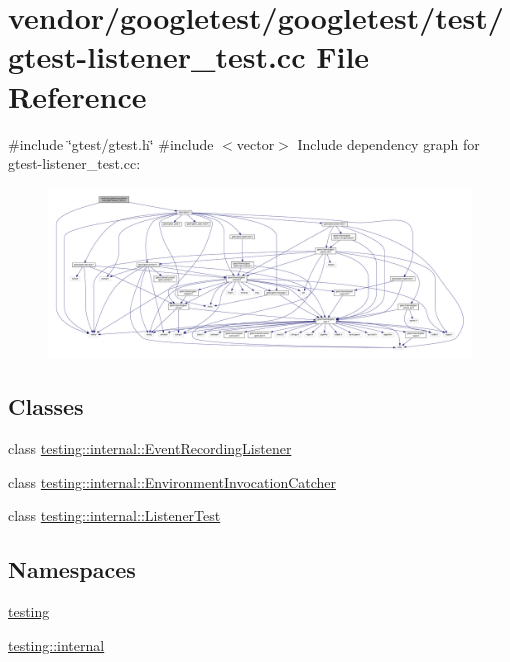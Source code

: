 \hypertarget{gtest-listener__test_8cc}{}\section{vendor/googletest/googletest/test/gtest-\/listener\+\_\+test.cc File Reference}
\label{gtest-listener__test_8cc}
{\ttfamily \#include \char`\"{}gtest/gtest.\+h\char`\"{}}\newline
{\ttfamily \#include $<$vector$>$}\newline
Include dependency graph for gtest-\/listener\+\_\+test.cc\+:
\nopagebreak
\begin{figure}[H]
\begin{center}
\leavevmode
\includegraphics[width=350pt]{gtest-listener__test_8cc__incl}
\end{center}
\end{figure}
\subsection*{Classes}
\begin{DoxyCompactItemize}
\item 
class \hyperlink{classtesting_1_1internal_1_1_event_recording_listener}{testing\+::internal\+::\+Event\+Recording\+Listener}
\item 
class \hyperlink{classtesting_1_1internal_1_1_environment_invocation_catcher}{testing\+::internal\+::\+Environment\+Invocation\+Catcher}
\item 
class \hyperlink{classtesting_1_1internal_1_1_listener_test}{testing\+::internal\+::\+Listener\+Test}
\end{DoxyCompactItemize}
\subsection*{Namespaces}
\begin{DoxyCompactItemize}
\item 
 \hyperlink{namespacetesting}{testing}
\item 
 \hyperlink{namespacetesting_1_1internal}{testing\+::internal}
\end{DoxyCompactItemize}
